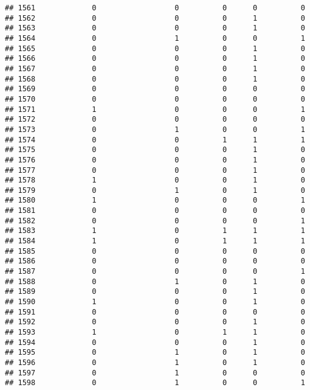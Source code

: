 \documentclass[
]{article}
\begin{document}
\begin{verbatim}
## 1561             0                  0          0      0          0
## 1562             0                  0          0      1          0
## 1563             0                  0          0      1          0
## 1564             0                  1          0      0          1
## 1565             0                  0          0      1          0
## 1566             0                  0          0      1          0
## 1567             0                  0          0      1          0
## 1568             0                  0          0      1          0
## 1569             0                  0          0      0          0
## 1570             0                  0          0      0          0
## 1571             1                  0          0      0          1
## 1572             0                  0          0      0          0
## 1573             0                  1          0      0          1
## 1574             0                  0          1      1          1
## 1575             0                  0          0      1          0
## 1576             0                  0          0      1          0
## 1577             0                  0          0      1          0
## 1578             1                  0          0      1          0
## 1579             0                  1          0      1          0
## 1580             1                  0          0      0          1
## 1581             0                  0          0      0          0
## 1582             0                  0          0      0          1
## 1583             1                  0          1      1          1
## 1584             1                  0          1      1          1
## 1585             0                  0          0      0          0
## 1586             0                  0          0      0          0
## 1587             0                  0          0      0          1
## 1588             0                  1          0      1          0
## 1589             0                  0          0      1          0
## 1590             1                  0          0      1          0
## 1591             0                  0          0      0          0
## 1592             0                  0          0      1          0
## 1593             1                  0          1      1          0
## 1594             0                  0          0      1          0
## 1595             0                  1          0      1          0
## 1596             0                  1          0      1          0
## 1597             0                  1          0      0          0
## 1598             0                  1          0      0          1

\end{verbatim}
\end{document}
